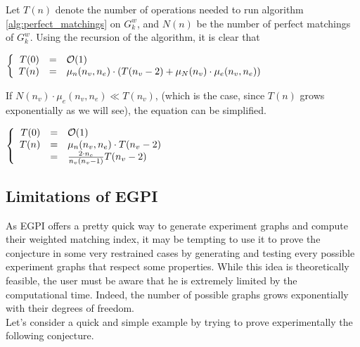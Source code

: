 \begin{enumerate}
    Let $T(n)$ denote the number of operations needed to run algorithm \ref{alg:perfect_matchings} on $G_k^w$, and $N(n)$ be the number of perfect matchings of $G_k^w$.
    Using the recursion of the algorithm, it is clear that
    \begin{center}
        $\left\{ \begin{array}{r c l}
                     T(0) & = & \mathcal{O}(1) \\
                     T(n) & = & \mu_n(n_v, n_e) \cdot \left( T(n_v - 2) + \mu_N(n_v) \cdot \mu_e(n_v, n_e) \right)
        \end{array}\right.$
    \end{center}

    If $N(n_v) \cdot \mu_e(n_v, n_e) \ll T(n_v)$, (which is the case, since $T(n)$ grows exponentially as we will see), the equation can be simplified.
    \begin{center}
        $\left\{\begin{array}{r c l}
                    T(0) & = & \mathcal{O}(1)                            \\
                    T(n) & = & \mu_n(n_v, n_e) \cdot T(n_v - 2)          \\
                    & = & \frac{2 \cdot n_e}{n_v(n_v-1)} T(n_v - 2) \\
        \end{array}\right.$
    \end{center}

\end{enumerate}

\subsection{Limitations of EGPI}
\label{subsec:EGPI_limitations}

As EGPI offers a pretty quick way to generate experiment graphs and compute their weighted matching index, it may be tempting to use it to prove the conjecture in some very restrained cases by generating and testing every possible experiment graphs that respect some properties.
While this idea is theoretically feasible, the user must be aware that he is extremely limited by the computational time.
Indeed, the number of possible graphs grows exponentially with their degrees of freedom.\\

Let's consider a quick and simple example by trying to prove experimentally the following conjecture.

